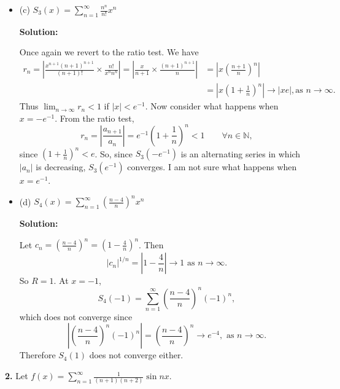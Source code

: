 \documentclass[12pt]{article}
\begin{document}
\begin{itemize}[label={},leftmargin=4mm, itemsep=1em, parsep=1em]
  \item (c) $S_{3}(x) = \sum_{n=1}^{\infty}\frac{n^{n}}{n!}x^{n}$ 

  {\bf Solution:}

  Once again we revert to the ratio test. We have
  \begin{align*}
    r_{n} = \left| \frac{x^{n+1}(n+1)^{n+1}}{(n+1)!}\times
    \frac{n!}{x^{n}n^{n}}\right| = \left| \frac{x}{n+1}\times
    \frac{(n+1)^{n+1}}{n}\right| & = \left| x\left(\frac{n+1}{n}\right)^{n}\right| \\
    & = \left| x\left(1+\frac{1}{n}\right)^{n}\right| \rightarrow |xe|, \text{
    as } n\rightarrow \infty.
  \end{align*}
  Thus $\lim_{n\rightarrow \infty}r_{n} < 1$ if $|x| <
  e^{-1}$. Now consider what happens when $x = -e^{-1}$. From the ratio test,
  \[ r_{n} = \left|\frac{a_{n+1}}{a_{n}}\right| =
  e^{-1}\left(1+\frac{1}{n}\right)^{n} < 1 \qquad \forall n \in \mathbb{N},\]
  since $\left(1+\frac{1}{n}\right)^{n} < e$. So, since $S_{3}(-e^{-1})$ is an
  alternating series in which $|a_{n}|$ is decreasing, $S_{3}(e^{-1})$
  converges. I am not sure what happens when $x = e^{-1}$.

  \item (d) $S_{4}(x) = \sum_{n=1}^{\infty}\left(\frac{n-4}{n}\right)^{n}x^{n}$

  {\bf Solution:}

  Let $c_{n} = \left(\frac{n-4}{n}\right)^{n} = \left(1 -
  \frac{4}{n}\right)^{n}$. Then
  \[ |c_{n}|^{1/n} = \left|1 - \frac{4}{n}\right|\rightarrow 1 \text{ as }
  n\rightarrow \infty.\]
  So $R = 1$. At $x = -1$, 
  \[ S_{4}(-1) = \sum_{n=1}^{\infty}\left(\frac{n-4}{n}\right)^{n}(-1)^{n}, \]
  which does not converge since
  \[\left|\left(\frac{n-4}{n}\right)^{n}(-1)^{n}\right| =
  \left(\frac{n-4}{n}\right)^{n} \rightarrow e^{-4}, \text{ as } n\rightarrow \infty.\]
  Therefore $S_{4}(1)$ does not converge either.
\end{itemize}

{\bf 2.} Let $f(x) = \sum_{n=1}^{\infty}\frac{1}{(n+1)(n+2)}\sin nx$.
\end{document}
